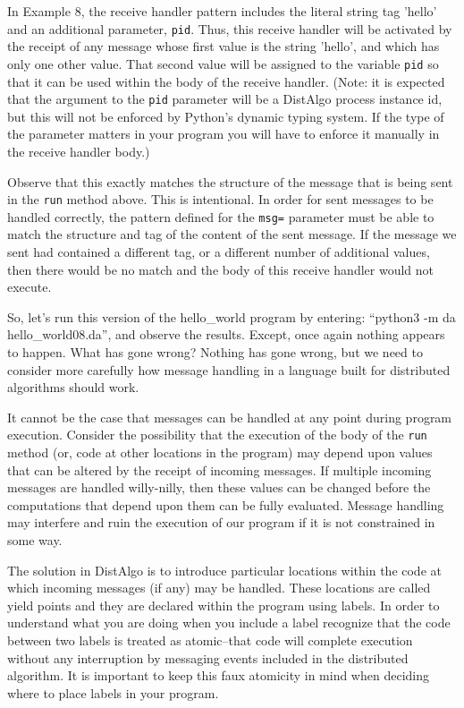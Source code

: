 \documentclass[11pt]{article}
\begin{document}
In Example 8, the receive handler pattern includes the literal string tag
'hello' and an additional parameter, \texttt{pid}. Thus, this receive
handler will be activated by the receipt of any message whose first value is
the string 'hello', and which has only one other value. That second value will
be assigned to the variable \texttt{pid} so that it can be used within the body
of the receive handler. (Note: it is expected that the argument to the 
\texttt{pid} parameter will be a DistAlgo process instance id, but this will
not be enforced by Python's dynamic typing system. If the type of the parameter
matters in your program you will have to enforce it manually in the receive
handler body.)

Observe that this exactly matches the structure of the message that is being
sent in the \texttt{run} method above. This is intentional. In order for sent
messages to be handled correctly, the pattern defined for the \texttt{msg=}
parameter must be able to match the structure and tag of the content of the
sent message. If the message we sent had contained a different tag, or a
different number of additional values, then there would be no match and the
body of this receive handler would not execute.

So, let's run this version of the hello\_world program by entering: 
``python3 -m da hello\_world08.da'', and observe the results. Except, once again
nothing appears to happen. What has gone wrong? Nothing has gone wrong, but we 
need to consider more carefully how message handling in a language built for
distributed algorithms should work.

It cannot be the case that messages can be handled at any point during program 
execution. Consider the possibility that the execution of the body of the 
\texttt{run} method (or, code at other locations in the program) may depend
upon values that can be altered by the receipt of incoming messages. If 
multiple incoming messages are handled willy-nilly, then these values can be
changed before the computations that depend upon them can be fully evaluated.
Message handling may interfere and ruin the execution of our program if it is
not constrained in some way.

The solution in DistAlgo is to introduce particular locations within the code
at which incoming messages (if any) may be handled. These locations are called
yield points and they are declared within the program using labels. In order to
understand what you are doing when you include a label recognize that the code
between two labels is treated as atomic--that code will complete execution 
without any interruption by messaging events included in the distributed 
algorithm. It is important to keep this faux atomicity in mind when deciding
where to place labels in your program.
\end{document}
